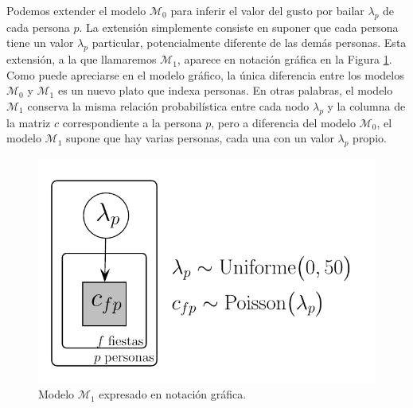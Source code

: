\documentclass{article}
\begin{document}
\indent Podemos extender el modelo $\mathcal M_0$ para inferir el valor del gusto por bailar $\lambda_p$ de cada persona $p$. La extensión simplemente consiste en suponer que cada persona tiene un valor $\lambda_p$ particular, potencialmente diferente de las demás personas. Esta extensión, a la que llamaremos $\mathcal M_1$, aparece en notación gráfica en la Figura \ref{fig:m_1}. Como puede apreciarse en el modelo gráfico, la única diferencia entre los modelos $\mathcal M_0$ y $\mathcal M_1$ es un nuevo plato que indexa personas. En otras palabras, el modelo $\mathcal M_1$ conserva la misma relación probabilística entre cada nodo $\lambda_p$ y la columna de la matriz $c$ correspondiente a la persona $p$, pero a diferencia del modelo $\mathcal M_0$, el modelo $\mathcal M_1$ supone que hay varias personas, cada una con un valor $\lambda_p$ propio.

\begin{figure}[H]
\centerline{\includegraphics[width=.65\textwidth]{m_1.pdf}}
\caption{Modelo $\mathcal M_1$ expresado en notación gráfica.}
\label{fig:m_1}
\end{figure}
\end{document}
